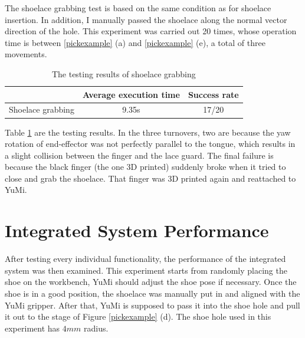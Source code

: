 The shoelace grabbing test is based on the same condition as for shoelace insertion. In addition, I manually passed the shoelace along the normal vector direction of the hole. This experiment was carried out 20 times, whose operation time is between \ref{pickexample} (a) and \ref{pickexample} (e), a total of three movements. 

\begin{table}[H]
\centering
\begin{tabular}{||c||c|c||}
\hline
 & Average execution time & Success rate \\ \hline \hline
Shoelace grabbing & 9.35s & 17/20 \\ \hline
\end{tabular}
\caption{The testing results of shoelace grabbing}
\label{pull}
\end{table}

Table \ref{pull} are the testing results. In the three turnovers, two are because the yaw rotation of end-effector was not perfectly parallel to the tongue, which results in a slight collision between the finger and the lace guard. The final failure is because the black finger (the one 3D printed) suddenly broke when it tried to close and grab the shoelace. That finger was 3D printed again and reattached to YuMi.

\section{Integrated System Performance}
After testing every individual functionality, the performance of the integrated system was then examined. This experiment starts from randomly placing the shoe on the workbench, YuMi should adjust the shoe pose if necessary. Once the shoe is in a good position, the shoelace was manually put in and aligned with the YuMi gripper. After that, YuMi is supposed to pass it into the shoe hole and pull it out to the stage of Figure \ref{pickexample} (d). The shoe hole used in this experiment has $4mm$ radius.

